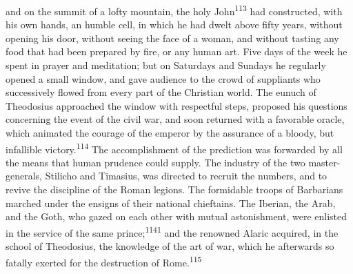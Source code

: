 and on the summit of a lofty mountain, the holy John\textsuperscript{113} had
constructed, with his own hands, an humble cell, in which he had
dwelt above fifty years, without opening his door, without seeing
the face of a woman, and without tasting any food that had been
prepared by fire, or any human art. Five days of the week he
spent in prayer and meditation; but on Saturdays and Sundays he
regularly opened a small window, and gave audience to the crowd
of suppliants who successively flowed from every part of the
Christian world. The eunuch of Theodosius approached the window
with respectful steps, proposed his questions concerning the
event of the civil war, and soon returned with a favorable
oracle, which animated the courage of the emperor by the
assurance of a bloody, but infallible victory.\textsuperscript{114} The
accomplishment of the prediction was forwarded by all the means
that human prudence could supply. The industry of the two
master-generals, Stilicho and Timasius, was directed to recruit
the numbers, and to revive the discipline of the Roman legions.
The formidable troops of Barbarians marched under the ensigns of
their national chieftains. The Iberian, the Arab, and the Goth,
who gazed on each other with mutual astonishment, were enlisted
in the service of the same prince;\textsuperscript{1141} and the renowned Alaric
acquired, in the school of Theodosius, the knowledge of the art
of war, which he afterwards so fatally exerted for the
destruction of Rome.\textsuperscript{115}





